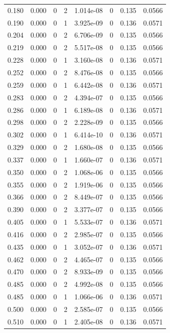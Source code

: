 \documentclass[preview]{standalone}
\begin{document}
{{\begin{tabular}{L{1.2cm}C{1.2cm} C{0.3cm}C{0.5cm} C{1.4cm}C{1.4cm} C{1.4cm}C{1.4cm}}
  0.180  &  0.000  & 0     &  2 &  1.014e-08  & 0  & 0.135 &  0.0566   \\ 
  0.190  &  0.000  & 0     &  1 &  3.925e-09  & 0  & 0.136 &  0.0571   \\ 
  0.204  &  0.000  & 0     &  2 &  6.706e-09  & 0  & 0.135 &  0.0566   \\ 
  0.219  &  0.000  & 0     &  2 &  5.517e-08  & 0  & 0.135 &  0.0566   \\ 
  0.228  &  0.000  & 0     &  1 &  3.160e-08  & 0  & 0.136 &  0.0571   \\ 
  0.252  &  0.000  & 0     &  2 &  8.476e-08  & 0  & 0.135 &  0.0566   \\ 
  0.259  &  0.000  & 0     &  1 &  6.442e-08  & 0  & 0.136 &  0.0571   \\ 
  0.283  &  0.000  & 0     &  2 &  4.394e-07  & 0  & 0.135 &  0.0566   \\ 
  0.286  &  0.000  & 0     &  1 &  6.189e-08  & 0  & 0.136 &  0.0571   \\ 
  0.298  &  0.000  & 0     &  2 &  2.228e-09  & 0  & 0.135 &  0.0566   \\ 
  0.302  &  0.000  & 0     &  1 &  6.414e-10  & 0  & 0.136 &  0.0571   \\ 
  0.329  &  0.000  & 0     &  2 &  1.680e-08  & 0  & 0.135 &  0.0566   \\ 
  0.337  &  0.000  & 0     &  1 &  1.660e-07  & 0  & 0.136 &  0.0571   \\ 
  0.350  &  0.000  & 0     &  2 &  1.068e-06  & 0  & 0.135 &  0.0566   \\ 
  0.355  &  0.000  & 0     &  2 &  1.919e-06  & 0  & 0.135 &  0.0566   \\ 
  0.366  &  0.000  & 0     &  2 &  8.449e-07  & 0  & 0.135 &  0.0566   \\ 
  0.390  &  0.000  & 0     &  2 &  3.377e-07  & 0  & 0.135 &  0.0566   \\ 
  0.405  &  0.000  & 0     &  1 &  5.533e-07  & 0  & 0.136 &  0.0571   \\ 
  0.416  &  0.000  & 0     &  2 &  2.985e-07  & 0  & 0.135 &  0.0566   \\ 
  0.435  &  0.000  & 0     &  1 &  3.052e-07  & 0  & 0.136 &  0.0571   \\ 
  0.462  &  0.000  & 0     &  2 &  4.465e-07  & 0  & 0.135 &  0.0566   \\ 
  0.470  &  0.000  & 0     &  2 &  8.933e-09  & 0  & 0.135 &  0.0566   \\ 
  0.485  &  0.000  & 0     &  2 &  4.992e-08  & 0  & 0.135 &  0.0566   \\ 
  0.485  &  0.000  & 0     &  1 &  1.066e-06  & 0  & 0.136 &  0.0571   \\ 
  0.500  &  0.000  & 0     &  2 &  2.585e-07  & 0  & 0.135 &  0.0566   \\ 
  0.510  &  0.000  & 0     &  1 &  2.405e-08  & 0  & 0.136 &  0.0571   \\ 
\hline 
\end{tabular} 

}}
\end{document}
